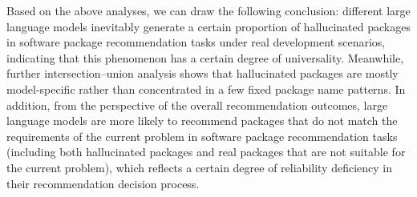 Based on the above analyses, we can draw the following conclusion: different large language models inevitably generate a certain proportion of hallucinated 
packages in software package recommendation tasks under real development scenarios, indicating that this phenomenon has a certain degree of universality. Meanwhile, 
further intersection–union analysis shows that hallucinated packages are mostly model-specific rather than concentrated in a few fixed package name patterns. 
In addition, from the perspective of the overall recommendation outcomes, large language models are more likely to recommend packages that do not match the 
requirements of the current problem in software package recommendation tasks (including both hallucinated packages and real packages that are not suitable for 
the current problem), which reflects a certain degree of reliability deficiency in their recommendation decision process.
